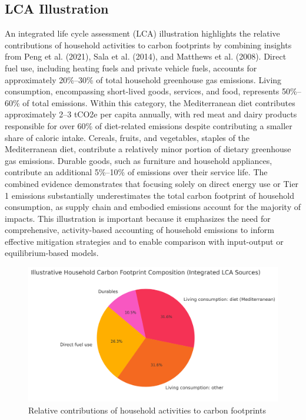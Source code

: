 \documentclass[12pt,a4paper]{article}%
\begin{document}
\subsection{LCA Illustration}

An integrated life cycle assessment (LCA) illustration highlights the relative contributions of household activities to carbon footprints by combining insights from Peng et al. (2021), Sala et al. (2014), and Matthews et al. (2008). Direct fuel use, including heating fuels and private vehicle fuels, accounts for approximately 20\%–30\% of total household greenhouse gas emissions. Living consumption, encompassing short-lived goods, services, and food, represents 50\%–60\% of total emissions. Within this category, the Mediterranean diet contributes approximately 2–3 tCO2e per capita annually, with red meat and dairy products responsible for over 60\% of diet-related emissions despite contributing a smaller share of caloric intake. Cereals, fruits, and vegetables, staples of the Mediterranean diet, contribute a relatively minor portion of dietary greenhouse gas emissions. Durable goods, such as furniture and household appliances, contribute an additional 5\%–10\% of emissions over their service life. The combined evidence demonstrates that focusing solely on direct energy use or Tier 1 emissions substantially underestimates the total carbon footprint of household consumption, as supply chain and embodied emissions account for the majority of impacts. This illustration is important because it emphasizes the need for comprehensive, activity-based accounting of household emissions to inform effective mitigation strategies and to enable comparison with input-output or equilibrium-based models.
\begin{figure}[h]
\centering
\includegraphics[width=0.8\linewidth]{LCA_pie_chart.png}
\caption{Relative contributions of household activities to carbon footprints}
\end{figure}
\end{document}
